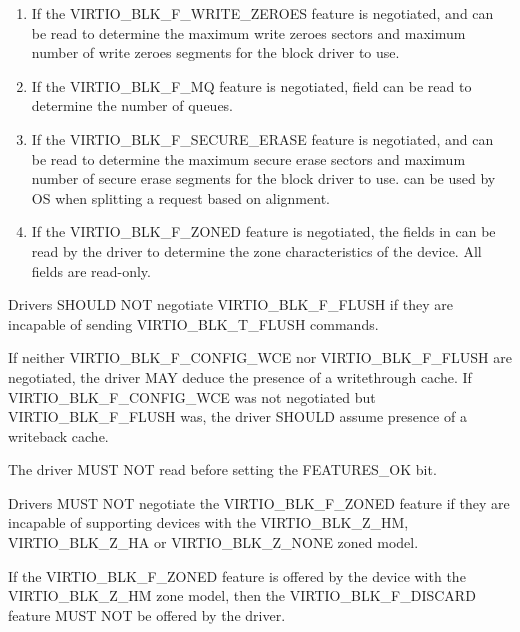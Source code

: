 \begin{enumerate}
\item If the VIRTIO_BLK_F_WRITE_ZEROES feature is negotiated,
     and  can
    be read to determine the maximum write zeroes sectors and maximum
    number of write zeroes segments for the block driver to use.

\item If the VIRTIO_BLK_F_MQ feature is negotiated,  field
    can be read to determine the number of queues.

\item If the VIRTIO_BLK_F_SECURE_ERASE feature is negotiated,
     and  can be read
    to determine the maximum secure erase sectors and maximum number of
    secure erase segments for the block driver to use.
     can be used by OS when splitting a
    request based on alignment.

\item If the VIRTIO_BLK_F_ZONED feature is negotiated, the fields in
     can be read by the driver to determine the zone
    characteristics of the device. All  fields are read-only.

\end{enumerate}


Drivers SHOULD NOT negotiate VIRTIO_BLK_F_FLUSH if they are incapable of
sending VIRTIO_BLK_T_FLUSH commands.

If neither VIRTIO_BLK_F_CONFIG_WCE nor VIRTIO_BLK_F_FLUSH are
negotiated, the driver MAY deduce the presence of a writethrough cache.
If VIRTIO_BLK_F_CONFIG_WCE was not negotiated but VIRTIO_BLK_F_FLUSH was,
the driver SHOULD assume presence of a writeback cache.

The driver MUST NOT read  before setting
the FEATURES_OK  bit.

Drivers MUST NOT negotiate the VIRTIO_BLK_F_ZONED feature if they are incapable
of supporting devices with the VIRTIO_BLK_Z_HM, VIRTIO_BLK_Z_HA or
VIRTIO_BLK_Z_NONE zoned model.

If the VIRTIO_BLK_F_ZONED feature is offered by the device with the
VIRTIO_BLK_Z_HM zone model, then the VIRTIO_BLK_F_DISCARD feature MUST NOT be
offered by the driver.

